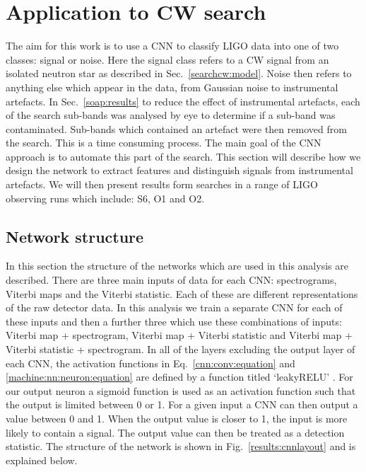 




\section{\label{machine:cw}Application to CW search}

The aim for this work is to use a \ac{CNN} to classify \ac{LIGO} data into one of two classes: signal or noise.
Here the signal class refers to a \ac{CW} signal from an isolated neutron star as described in Sec.~\ref{searchcw:model}.
Noise then refers to anything else which appear in the data, from Gaussian noise to instrumental artefacts. 
In Sec.~\ref{soap:results} to reduce the effect of instrumental artefacts, each of the search sub-bands was analysed by eye to determine if a sub-band was contaminated. 
Sub-bands which contained an artefact were then removed from the search.
This is a time consuming process. The main goal of the \ac{CNN} approach is to automate this part of the search.
This section will describe how we design the network to extract features and distinguish signals from instrumental artefacts.
We will then present results form searches in a range of \ac{LIGO} observing runs which include: S6, O1 and O2.


\subsection{\label{machine:cw:structure}Network structure}

In this section the structure of the networks which are used in this analysis
are described. There are three main inputs of data for each \ac{CNN}: spectrograms, Viterbi maps and the Viterbi statistic. Each of these are different representations of the raw detector data. In this analysis we train a separate \ac{CNN} for each of
these inputs and then a further three which use these combinations of inputs:
Viterbi map + spectrogram, Viterbi map + Viterbi statistic and Viterbi map +
Viterbi statistic + spectrogram. In all of the layers excluding the output layer of each \ac{CNN}, the activation functions in Eq.~\ref{cnn:conv:equation} and \ref{machine:nn:neuron:equation} are defined by a function titled `leakyRELU' \cite{maas2013RectifierNonlinearities}. 
For our output neuron a sigmoid function is
used as an activation function such that the output is limited between 0 or 1.
For a given input a \ac{CNN} can then output a value between 0 and 1. When the output value is closer to 1, the input is more likely to contain a signal. 
The output value can then be treated as a detection statistic. 
The structure of the network is shown in Fig.~\ref{results:cnnlayout} and is explained below. 

